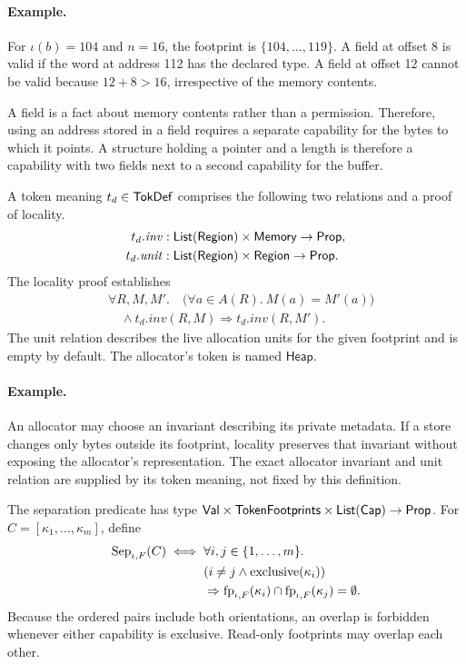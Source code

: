\paragraph{Example.} For $\iota(b)=104$ and $n=16$, the footprint is $\{104,\ldots,119\}$. A field at offset 8 is valid if the word at address 112 has the declared type. A field at offset 12 cannot be valid because $12+8>16$, irrespective of the memory contents.


A field is a fact about memory contents rather than a permission. Therefore, using an address stored in a field requires a separate capability for the bytes to which it points. A structure holding a pointer and a length is therefore a capability with two fields next to a second capability for the buffer.

\begin{definition}\label{def:tok}
A token meaning $t_d\in\mathsf{TokDef}$ comprises the following two relations and a proof of locality.
\[
\begin{aligned}
t_d.\mathit{inv}&:\mathsf{List}(\mathsf{Region})\times\mathsf{Memory}\to\mathsf{Prop},\\
t_d.\mathit{unit}&:\mathsf{List}(\mathsf{Region})\times\mathsf{Region}\to\mathsf{Prop}.
\end{aligned}
\]
The locality proof establishes
\[
\begin{aligned}&\forall R,M,M'.\quad\big(\forall a\in A(R).\ M(a)=M'(a)\big)\\ &\quad\land t_d.\mathit{inv}(R,M)\Rightarrow t_d.\mathit{inv}(R,M').\end{aligned}
\]
The unit relation describes the live allocation units for the given footprint and is empty by default. The allocator's token is named $\mathsf{Heap}$.
\end{definition}

\paragraph{Example.} An allocator may choose an invariant describing its private metadata. If a store changes only bytes outside its footprint, locality preserves that invariant without exposing the allocator's representation. The exact allocator invariant and unit relation are supplied by its token meaning, not fixed by this definition.


\begin{definition}\label{def:sep}
The separation predicate has type $\mathsf{Val}\times\mathsf{TokenFootprints}\times\mathsf{List}(\mathsf{Cap})\to\mathsf{Prop}$. For $C=[\kappa_1,\ldots,\kappa_m]$, define
\[
\begin{aligned}\mathrm{Sep}_{\iota,F}(C)\iff{}&\forall i,j\in\{1,\ldots,m\}.\\ &(i\ne j\land\mathrm{exclusive}(\kappa_i))\\ &\Rightarrow\mathrm{fp}_{\iota,F}(\kappa_i)\cap\mathrm{fp}_{\iota,F}(\kappa_j)=\emptyset.\end{aligned}
\]
Because the ordered pairs include both orientations, an overlap is forbidden whenever either capability is exclusive. Read-only footprints may overlap each other.
\end{definition}

